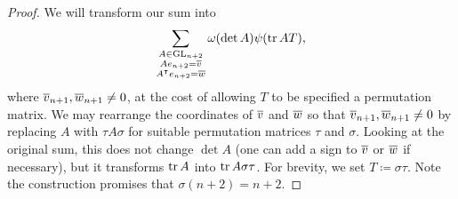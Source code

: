 \begin{proof}
    We will transform our sum into
    \[\sum_{\substack{A\in\mathrm{GL}_{n+2}\\Ae_{n+2}=\overline{v}\\A^\intercal e_{n+2}=\overline{w}}}\omega(\det A)\psi(\operatorname{tr} AT),\]
    where $\overline{v}_{n+1},\overline{w}_{n+1}\ne0$, at the cost of allowing $T$ to be specified a permutation matrix.
    We may rearrange the coordinates of $\overline{v}$ and $\overline{w}$ so that $\overline{v}_{n+1},\overline{w}_{n+1}\ne0$ by replacing $A$ with $\tau A\sigma$ for suitable permutation matrices $\tau$ and $\sigma$.
    Looking at the original sum, this does not change $\det A$ (one can add a sign to $\overline{v}$ or $\overline{w}$ if necessary), but it transforms $\operatorname{tr} A$ into $\operatorname{tr} A\sigma\tau$. For brevity, we set $T\coloneqq\sigma\tau$. Note the construction promises that $\sigma(n+2)=n+2$.


\end{proof}
